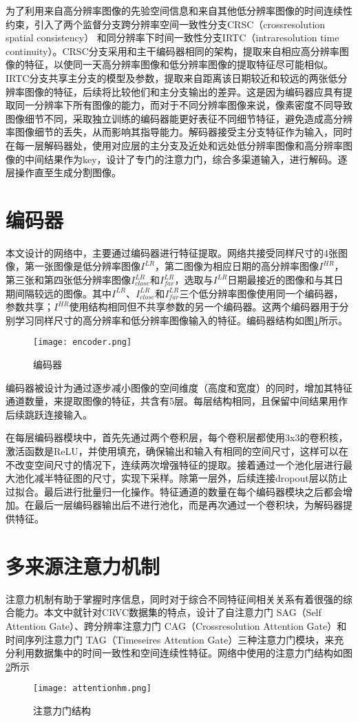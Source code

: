 为了利用来自高分辨率图像的先验空间信息和来自其他低分辨率图像的时间连续性约束，引入了两个监督分支跨分辨率空间一致性分支CRSC（crossresolution spatial consistency） 和同分辨率下时间一致性分支IRTC（intraresolution time continuity）。CRSC分支采用和主干编码器相同的架构，提取来自相应高分辨率图像的特征，以使同一天高分辨率图像和低分辨率图像的提取特征尽可能相似。IRTC分支共享主分支的模型及参数，提取来自距离该日期较近和较远的两张低分辨率图像的特征，后续将比较他们和主分支输出的差异。这是因为编码器应具有提取同一分辨率下所有图像的能力，而对于不同分辨率图像来说，像素密度不同导致图像细节不同，采取独立训练的编码器能更好表征不同细节特征，避免造成高分辨率图像细节的丢失，从而影响其指导能力。解码器接受主分支特征作为输入，同时在每一层解码器处，使用对应层的主分支及近处和远处低分辨率图像和高分辨率图像的中间结果作为key，设计了专门的注意力门，综合多渠道输入，进行解码。逐层操作直至生成分割图像。
\section{编码器}
本文设计的网络中，主要通过编码器进行特征提取。网络共接受同样尺寸的4张图像，第一张图像是低分辨率图像\( I^{LR}\)，第二图像为相应日期的高分辨率图像\( I^{HR}\)，第三张和第四张低分辨率图像\( I^{LR}_{close}\)和\( I^{LR}_{far}\)，选取与\( I^{LR}\)日期最接近的图像和与其日期间隔较远的图像。其中\( I^{LR}\)、\(I^{LR}_{close}\)和\( I^{LR}_{far}\)三个低分辨率图像使用同一个编码器，参数共享；\( I^{HR}\)使用结构相同但不共享参数的另一个编码器。这两个编码器用于分别学习同样尺寸的高分辨率和低分辨率图像输入的特征。编码器结构如图\ref{fig:encoder}所示。
\begin{figure}[h]
    \centering
    \texttt{[image: encoder.png]}
    \caption{编码器}
    \label{fig:encoder}
  \end{figure}

编码器被设计为通过逐步减小图像的空间维度（高度和宽度）的同时，增加其特征通道数量，来提取图像的特征，共含有5层。每层结构相同，且保留中间结果用作后续跳跃连接输入。

在每层编码器模块中，首先先通过两个卷积层，每个卷积层都使用3x3的卷积核，激活函数是ReLU，并使用填充，确保输出和输入有相同的空间尺寸，这样可以在不改变空间尺寸的情况下，连续两次增强特征的提取。接着通过一个池化层进行最大池化减半特征图的尺寸，实现下采样。除第一层外，后续连接dropout层以防止过拟合。最后进行批量归一化操作。特征通道的数量在每个编码器模块之后都会增加。在最后一层编码器输出后不进行池化，而是再次通过一个卷积块，为解码器提供特征。


\section{多来源注意力机制}
注意力机制有助于掌握时序信息，同时对于综合不同特征间相关关系有着很强的综合能力。本文中就针对CRVC数据集的特点，设计了自注意力门 SAG（Self Attention Gate）、跨分辨率注意力门 CAG（Crossresolution Attention Gate）和时间序列注意力门 TAG（Timeseires Attention Gate）三种注意力门模块，来充分利用数据集中的时间一致性和空间连续性特征。网络中使用的注意力门结构如图\ref{fig:ag}所示
\begin{figure}[h]
    \centering
    \texttt{[image: attentionhm.png]}
    \caption{注意力门结构}
    \label{fig:ag}
  \end{figure}

